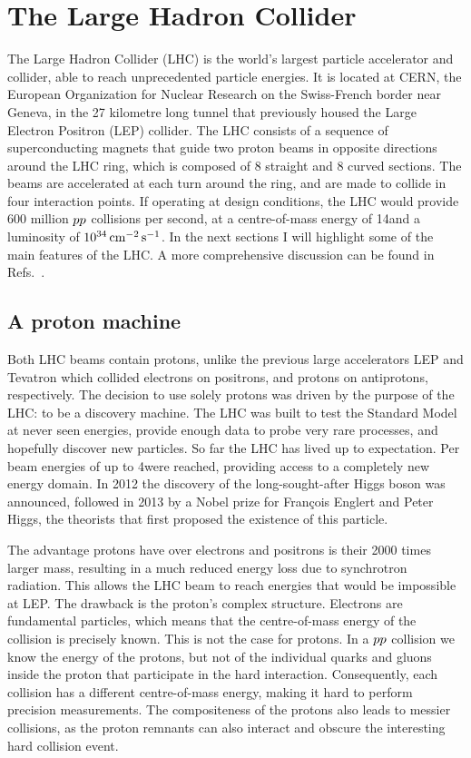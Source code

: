 \section{The Large Hadron Collider \label{chap:LHC}}

The Large Hadron Collider (LHC) is the world's largest particle accelerator and collider, able to
reach unprecedented particle energies. It is located at CERN, the European Organization for Nuclear
Research on the Swiss-French border near Geneva, in the 27 kilometre long tunnel that previously
housed the Large Electron Positron (LEP) collider. The LHC consists of a sequence of superconducting
magnets that guide two proton beams in opposite directions around the LHC ring, which is composed
of 8 straight and 8 curved sections. 
The beams are accelerated at each turn around the ring, and are made to collide in four interaction
points.
If operating at design conditions, the LHC would provide 600 million ${p}{p}$
collisions per second, at a centre-of-mass energy of 14\TeV and a luminosity of
$\text{10}^\text{34}\,\text{cm}^\text{$-$2}\,\text{s}^\text{$-$1}$. 
In the next sections I will highlight some of the main features of the LHC. A more comprehensive
discussion
can be found in Refs.~\cite{Evans:2008zzb,Bruning:2007zzc,Lefevre:1165534,LHC_website}. 

\subsection{A proton machine \label{sec:LHC_proton_machine}}

Both LHC beams contain protons, unlike the previous large accelerators LEP and Tevatron which
collided electrons on positrons, and protons on antiprotons, respectively. 
The decision to use solely protons was driven by the purpose of the LHC: to be a discovery machine.
The LHC was built to test the Standard Model at never seen energies, provide enough data to
probe very rare processes, and hopefully discover new particles. So far the LHC has lived up to
expectation. Per beam energies of up to 4\TeV were reached, providing access to a completely new
energy domain. In 2012 the discovery of the long-sought-after Higgs boson was announced, followed in
2013 by a Nobel prize for Fran\c{c}ois Englert and Peter Higgs, the theorists that first proposed
the existence of this particle. 

The advantage protons have over electrons and positrons is their 2000 times larger mass, resulting
in a much reduced energy loss due to synchrotron radiation. This allows the LHC beam to reach
energies that would be impossible at LEP.
The drawback is the proton's complex structure. Electrons are fundamental particles, which
means that the centre-of-mass energy of the collision is precisely known. This is not the case for
protons. In a ${p}{p}$ collision we know the energy of the protons, but not of the individual quarks
and gluons inside the proton that participate in the hard interaction. Consequently, each collision
has a different centre-of-mass energy, making it hard to perform precision measurements. The
compositeness of the protons also leads to messier collisions, as the proton remnants can also
interact and obscure the interesting hard collision event. 

